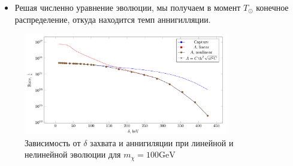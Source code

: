 \begin{itemize}
	\item Решая численно уравнение эволюции, мы получаем в момент $T_{\odot}$ конечное распределение, откуда находится темп аннигилляции.
\end{itemize}


\begin{figure}[!h]
	\centering
	\includegraphics[width=0.8\textwidth]{images/LinearNonLinear.png}
	\caption{Зависимость от $\delta$ захвата и аннигиляции при линейной и нелинейной эволюции для $m_{\chi} = 100\text{GeV}$}
\end{figure}

